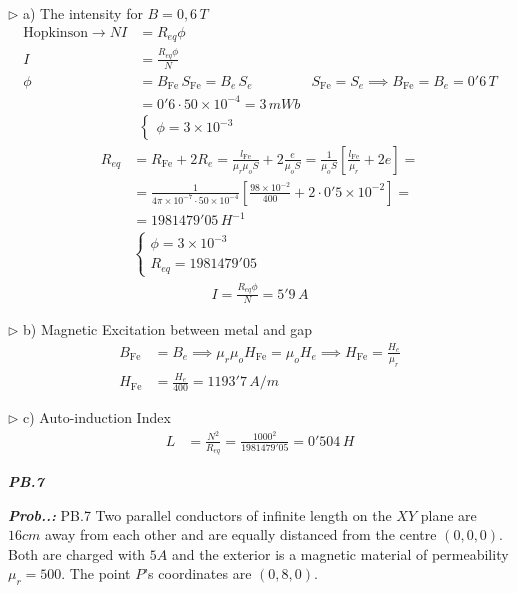\documentclass[a4paper]{article}
\begin{document}
$\triangleright$ a) The intensity for $B=0,6\,T$
\begin{align}
\text{Hopkinson}\to NI&=R_{eq}\phi \\
I&=\frac{R_{eq}\phi}{N} \\
\phi&=B_{\text{Fe}}\,S_{\text{Fe}}=B_{e}\,S_{e} & S_{\text{Fe}}=S_{e}\implies B_{\text{Fe}}=B_{e}=0'6\,T \\
&=0'6\cdot 50\times 10^{-4}=3\,mWb \\
&\begin{cases}
\phi=3\times 10^{-3}
\end{cases}
\end{align}
\begin{align}
R_{eq}&=R_{\text{Fe}}+2R_{e}=\frac{l_{\text{Fe}}}{\mu_{r}\mu_{o}S}+2 \frac{e}{\mu_{o}S}=\frac{1}{\mu_{o}S}\left[ \frac{l_{\text{Fe}}}{\mu_{r}}+2e \right]= \\
&=\frac{1}{4\pi \times 10^{-7}\cdot 50\times 10^{-4}}\left[ \frac{98\times 10^{-2}}{400}+2\cdot 0'5\times 10^{-2} \right]= \\
&=1981479'05\,H^{-1} \\
&\begin{cases}
\phi=3 \times 10^{-3} \\
R_{eq}=1981479'05
\end{cases}
\end{align}
\begin{align}
I=\frac{R_{eq}\phi}{N}=\boxed{5'9\,A}
\end{align}

$\triangleright$ b) Magnetic Excitation between metal and gap
\begin{align}
B_{\text{Fe}}&=B_{e}\implies \mu_{r}\mu_{o}H_{\text{Fe}}=\mu_{o}H_{e}\implies H_{\text{Fe}}=\frac{H_{e}}{\mu_{r}} \\
H_{\text{Fe}}&=\frac{H_{e}}{400}=\boxed{1193'7\,A / m}
\end{align}

$\triangleright$ c) Auto-induction Index
\begin{align}
L&=\frac{N^{2}}{R_{eq}}=\frac{1000^{2}}{1981479'05}=\boxed{0'504\,H}
\end{align}

\textbf{\textit{PB.7}}

\setcounter{equation}{0}
\vspace{2ex}\textbf{\textit{Prob.\thesection.\theprob: }}PB.7 Two parallel conductors of infinite length on the $XY$ plane are $16cm$ away from each other and are equally distanced from the centre $(0,0,0)$. Both are charged with $5A$ and the exterior is a magnetic material of permeability $\mu_{r}=500$. The point $P$'s coordinates are $(0,8,0)$.
\end{document}
